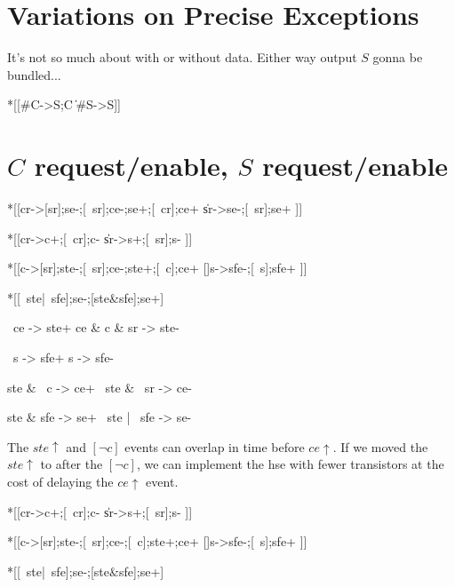 \documentclass{article}
\begin{document}

\section{Variations on Precise Exceptions}

It's not so much about with or without data. 
Either way output $S$ gonna be bundled...

\begin{csp}
*[[#C->S;C
  \|#S->S]]
\end{csp}


\section{$C$ request/enable, $S$ request/enable}

\begin{hse}
*[[cr->[sr];se-;[~sr];ce-;se+;[~cr];ce+
  \|sr->se-;[~sr];se+
 ]]
\end{hse}

\begin{hse}
*[[cr->c+;[~cr];c-
  \|sr->s+;[~sr];s-
 ]]

*[[c->[sr];ste-;[~sr];ce-;ste+;[~c];ce+
  []s->sfe-;[~s];sfe+
 ]]

*[[~ste|~sfe];se-;[ste&sfe];se+]
\end{hse}

\begin{prs2}
~ce -> ste+
ce & c & sr -> ste-

~s -> sfe+
s -> sfe-
\end{prs2}

\begin{prs2}
ste & ~c -> ce+
~ste & ~sr -> ce-
\end{prs2}

\begin{prs2}
ste & sfe -> se+
~ste | ~sfe -> se-
\end{prs2}

\noindent
The $ste\uparrow$ and $[\neg c]$ events can overlap in time before $ce\uparrow$.
If we moved the $ste\uparrow$ to after the $[\neg c]$, 
we can implement the hse with fewer transistors at the cost of delaying the $ce\uparrow$ event.

\begin{hse}
*[[cr->c+;[~cr];c-
  \|sr->s+;[~sr];s-
 ]]

*[[c->[sr];ste-;[~sr];ce-;[~c];ste+;ce+
  []s->sfe-;[~s];sfe+
 ]]

*[[~ste|~sfe];se-;[ste&sfe];se+]
\end{hse}
\end{document}
